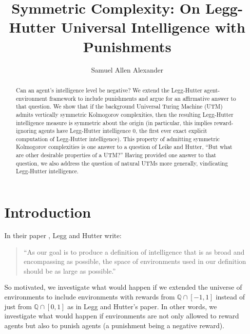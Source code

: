 \documentclass{article}
\title{Symmetric Complexity: On Legg-Hutter Universal Intelligence with Punishments}
\author{Samuel Allen Alexander}
\begin{document}
\maketitle

\begin{abstract}
    Can an agent's intelligence level be negative?
    We extend the Legg-Hutter agent-environment framework to include punishments
    and argue for an affirmative answer to that question.
    We show that if the background Universal Turing Machine (UTM) admits
    vertically symmetric Kolmogorov complexities,
    then the resulting Legg-Hutter intelligence measure is symmetric about
    the origin (in particular, this implies reward-ignoring agents
    have Legg-Hutter intelligence $0$, the first ever exact explicit computation
    of Legg-Hutter intelligence). This property of admitting symmetric
    Kolmogorov complexities is one answer to a question of Leike and Hutter,
    ``But what are other desirable properties of a UTM?'' Having provided one
    answer to that question, we also address the question of natural UTMs
    more generally, vindicating Legg-Hutter intelligence.
\end{abstract}

\section{Introduction}

In their paper \cite{legg2007universal}, Legg and Hutter write:
\begin{quote}
    ``As our goal is to produce a definition of intelligence that is as broad and
    encompassing as possible, the space of environments used in our definition should
    be as large as possible.''
\end{quote}
So motivated, we investigate what would happen if we extended the universe
of environments to include environments with rewards from $\mathbb Q\cap [-1,1]$
instead of just from $\mathbb Q\cap [0,1]$ as in Legg and Hutter's paper.
In other words, we investigate what would happen if environments are not only
allowed to reward agents but also to punish agents (a punishment being a negative
reward).
\end{document}
